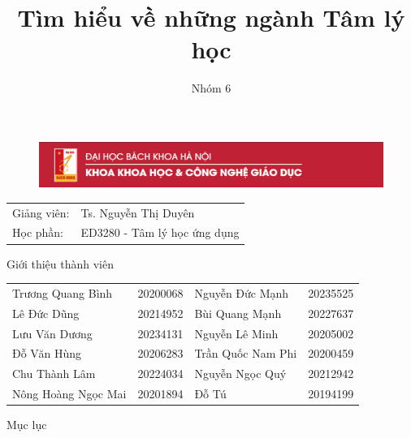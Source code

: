 \documentclass[presentation]{beamer}
\begin{document}
\title{Tìm hiểu về những ngành Tâm lý học}
\author{Nhóm 6}
\date{}

\begin{frame}
	\vspace*{-15.5mm}
	\begin{figure}[H]
		\hspace*{-4.7mm}
		\includegraphics[width = \paperwidth]{logo_cngd}
	\end{figure}
	\vspace{-5mm}
	\maketitle
	\vspace{-10mm}
	\centering
	\begin{tabular}{ll}
		Giảng viên: & Ts. Nguyễn Thị Duyên\\
		Học phần: & ED3280 - Tâm lý học ứng dụng
	\end{tabular}
\end{frame}

\begin{frame}{Giới thiệu thành viên}
	\begin{tabular}{ll@{\hskip 1cm}ll}
		Trương Quang Bình & 20200068 & Nguyễn Đức Mạnh & 20235525\\[5mm]
		Lê Đức Dũng & 20214952 & Bùi Quang Mạnh & 20227637\\[5mm]
		Lưu Văn Dương & 20234131 & Nguyễn Lê Minh & 20205002\\[5mm]
		Đỗ Văn Hùng & 20206283 & Trần Quốc Nam Phi & 20200459\\[5mm]
		Chu Thành Lâm & 20224034 & Nguyễn Ngọc Quý & 20212942\\[5mm]
		Nông Hoàng Ngọc Mai & 20201894 & Đỗ Tú & 20194199
	\end{tabular}
\end{frame}

\begin{frame}{Mục lục}
    \begin{columns}[t]
        \begin{column}{0.5\textwidth}
            \tableofcontents[sections={1-3}]
        \end{column}
        \begin{column}{0.5\textwidth}
            \tableofcontents[sections={4-}]
        \end{column}
    \end{columns}
	
\end{frame}
\end{document}
